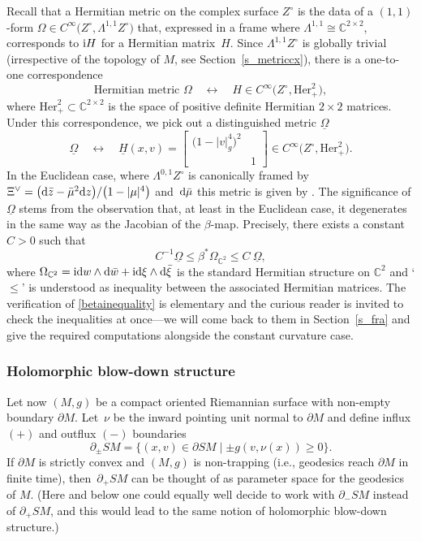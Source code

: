 \documentclass[10pt,a4paper]{amsart}
\numberwithin{equation}{section}
\theoremstyle{definition}
\newcommand{\C}{\mathbb{C}} %
\newcommand{\1}{{\bf 1}}
\newcommand{\Om}{{\underline{\Omega}}}
\begin{document}
Recall that a Hermitian metric on the complex surface $Z^\circ$ is the data of a $(1,1)$-form $\Omega\in C^\infty\bigl(Z^\circ,\Lambda^{1,1}Z^\circ\bigr)$ that, expressed in a frame where $\Lambda^{1,1}\cong \C^{2\times 2}$, corresponds to ${\rm i}H$ for a Hermitian matrix~$H$. Since $\Lambda^{1,1}Z^\circ$ is globally trivial (irrespective of the topology of $M$, see Section~\ref{s_metriccx}), there is a one-to-one correspondence
\[
	\text{Hermitian metric $\Omega$} \quad \leftrightarrow \quad H\in C^\infty\bigl(Z^\circ,\mathrm{Her}_+^2\bigr),
\]
where $\mathrm{Her}_+^2\subset \C^{2\times 2}$ is the space of positive definite Hermitian $2\times 2$ matrices.
 Under this correspondence, we pick out a distinguished metric $\Om$
\begin{equation}\label{def_om}
	\Om \quad \leftrightarrow \quad \underline{H}(x,v)=\begin{bmatrix}
 \bigl(1-|v|_g^4\bigr)^2 &\\
 & 1
\end{bmatrix} \in C^\infty\bigl(Z^\circ,\mathrm{Her}_+^2\bigr).
\end{equation}
In the Euclidean case, where $\Lambda^{0,1}Z^\circ$ is canonically framed by $ \Xi^\vee = \bigl({\rm d}\bar z - \bar \mu^2 {\rm d}z \bigr)/\bigl(1-|\mu|^4\bigr)$ and~${\rm d}\bar \mu$ this metric is given by
\smash{$ \Om ={\rm i} \bigl(1-|\mu|^4\bigr)^2 \bar \Xi^\vee\wedge \Xi^\vee + {\rm i} {\rm d}\mu \wedge {\rm d}\bar \mu$}.
The significance of $\Om$ stems from the observation that, at least in the Euclidean case, it degenerates in the same way as the Jacobian of the $\beta$-map. Precisely, there exists a constant $C>0$ such that
\begin{equation}\label{betainequality}
	C^{-1} \Om \le \beta^*\Omega_{\C^2} \le C~\Om,
\end{equation}
where $\Omega_{\C^2}={\rm i}{\rm d}w\wedge {\rm d}\bar w + {\rm i} {\rm d}\xi \wedge {\rm d}\bar \xi$ is the standard Hermitian structure on $\C^2$ and `$\le$' is understood as inequality between the associated Hermitian matrices. The verification of \eqref{betainequality} is elementary and the curious reader is invited to check the inequalities at once---we will come back to them in Section~\ref{s_fra} and give the required computations alongside the constant curvature case.

\subsubsection{Holomorphic blow-down structure}
Let now $(M,g)$ be a compact oriented Riemannian surface with non-empty boundary $\partial M$. Let~$\nu$ be the inward pointing unit normal to $\partial M$ and define
influx $(+)$ and outflux $(-)$ boundaries
\[
	\partial_\pm SM=\{(x,v)\in \partial SM\mid \pm g(v,\nu(x))\ge 0\}.
\]
If $\partial M$ is strictly convex and $(M,g)$ is non-trapping (i.e., geodesics reach $\partial M$ in finite time), then~$\partial_+SM$ can be thought of as
 parameter space for the geodesics of $M$. (Here and below one could equally well decide to work with $\partial_-SM$ instead of $\partial_+SM$, and this would lead to the same notion of holomorphic blow-down structure.)
\end{document}
